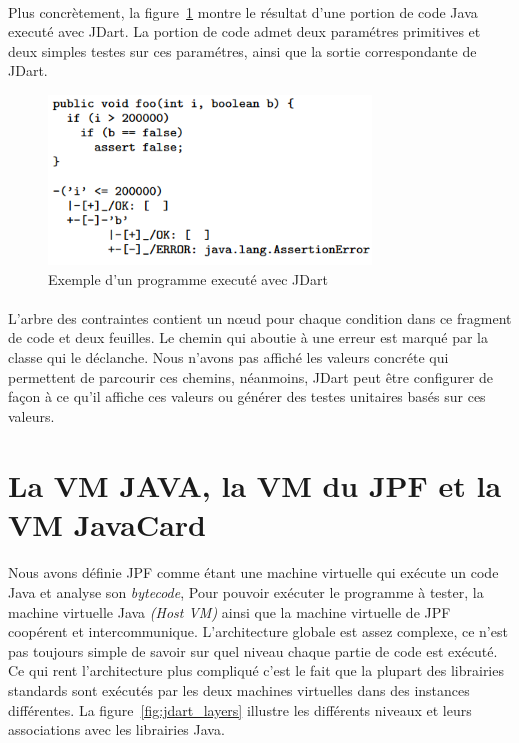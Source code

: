 			\paragraph{}
				Plus concrètement, la figure~\ref{fig:jdart_sample} montre le résultat d'une portion de code Java executé avec JDart.
				La portion de code admet deux paramétres primitives et deux simples testes sur ces paramétres, ainsi que la sortie correspondante
				de JDart.
				
			\begin{figure}[H]
				\centering
					\includegraphics[scale=0.5]{images/jdart_exemple.png}
				\caption{\label{fig:jdart_sample} Exemple d'un programme executé avec JDart}
			\end{figure}
			
			\paragraph{}
				L'arbre des contraintes contient un n\oe{}ud pour chaque condition dans ce fragment de code et deux feuilles.
				Le chemin qui aboutie à une erreur est marqué par la classe qui le déclanche.
				Nous n'avons pas affiché les valeurs concréte qui permettent de parcourir ces chemins, néanmoins, JDart peut être configurer
				de façon à ce qu'il affiche ces valeurs ou générer des testes unitaires basés sur ces valeurs.
      
	\section{La VM JAVA, la VM du JPF et la VM JavaCard}
		\paragraph{}
			Nous avons définie \gls{JPF} comme étant une machine virtuelle qui exécute un code Java et analyse son \textit{\gls{bytecode}},
			Pour pouvoir exécuter le programme à tester, la machine virtuelle Java \textit{(Host VM)} ainsi que la machine virtuelle de \gls{JPF}
			coopérent et intercommunique.
			L'architecture globale est assez complexe, ce n'est pas toujours simple de savoir sur quel niveau chaque partie de code est exécuté.
			Ce qui rent l'architecture plus compliqué c'est le fait que la plupart des librairies standards sont exécutés par les deux machines
			virtuelles dans des instances différentes.
			La figure~\ref{fig:jdart_layers} illustre les différents niveaux et leurs associations avec les librairies Java.
			
